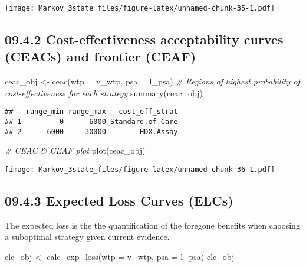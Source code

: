 \documentclass[
]{article}
\newenvironment{Shaded}{\begin{snugshade}}{\end{snugshade}}
\newcommand{\AttributeTok}[1]{\textcolor[rgb]{0.77,0.63,0.00}{#1}}
\newcommand{\CommentTok}[1]{\textcolor[rgb]{0.56,0.35,0.01}{\textit{#1}}}
\newcommand{\FunctionTok}[1]{\textcolor[rgb]{0.00,0.00,0.00}{#1}}
\newcommand{\NormalTok}[1]{#1}
\newcommand{\OtherTok}[1]{\textcolor[rgb]{0.56,0.35,0.01}{#1}}
\begin{document}
\texttt{[image: Markov\_3state\_files/figure-latex/unnamed-chunk-35-1.pdf]}

\hypertarget{cost-effectiveness-acceptability-curves-ceacs-and-frontier-ceaf}{%
\subsection{09.4.2 Cost-effectiveness acceptability curves (CEACs) and
frontier
(CEAF)}\label{cost-effectiveness-acceptability-curves-ceacs-and-frontier-ceaf}}

\begin{Shaded}
\begin{Highlighting}[]
\NormalTok{ceac\_obj }\OtherTok{\textless{}{-}} \FunctionTok{ceac}\NormalTok{(}\AttributeTok{wtp =}\NormalTok{ v\_wtp, }\AttributeTok{psa =}\NormalTok{ l\_psa)}
\CommentTok{\# Regions of highest probability of cost{-}effectiveness for each strategy}
\FunctionTok{summary}\NormalTok{(ceac\_obj)}
\end{Highlighting}
\end{Shaded}

\begin{verbatim}
##   range_min range_max   cost_eff_strat
## 1         0      6000 Standard.of.Care
## 2      6000     30000        HDX.Assay
\end{verbatim}

\begin{Shaded}
\begin{Highlighting}[]
\CommentTok{\# CEAC \& CEAF plot}
\FunctionTok{plot}\NormalTok{(ceac\_obj)}
\end{Highlighting}
\end{Shaded}

\texttt{[image: Markov\_3state\_files/figure-latex/unnamed-chunk-36-1.pdf]}

\hypertarget{expected-loss-curves-elcs}{%
\subsection{09.4.3 Expected Loss Curves
(ELCs)}\label{expected-loss-curves-elcs}}

The expected loss is the the quantification of the foregone benefits
when choosing a suboptimal strategy given current evidence.

\begin{Shaded}
\begin{Highlighting}[]
\NormalTok{elc\_obj }\OtherTok{\textless{}{-}} \FunctionTok{calc\_exp\_loss}\NormalTok{(}\AttributeTok{wtp =}\NormalTok{ v\_wtp, }\AttributeTok{psa =}\NormalTok{ l\_psa)}
\NormalTok{elc\_obj}
\end{Highlighting}
\end{Shaded}
\end{document}
